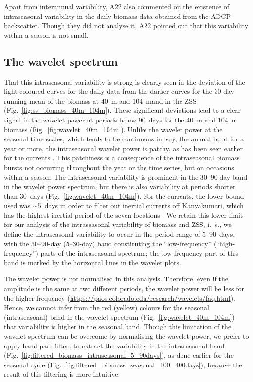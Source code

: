 \documentclass[authoryear,review,11pt]{elsarticle}
\providecommand{\DIFaddtex}[1]{{\protect\color{blue}\uwave{#1}}} %
\providecommand{\DIFaddbegin}{} %
\providecommand{\DIFaddend}{} %
\providecommand{\DIFadd}[1]{\texorpdfstring{\DIFaddtex{#1}}{#1}} %
\begin{document}
Apart from interannual variability, A22 also commented on the existence of intraseasonal variability in the daily biomass data obtained from the ADCP backscatter. Though they did not analyse it, A22 pointed out that this variability within a season is not small.

\subsection{The wavelet spectrum}
\label{sec:intraseasonal.wavelet}

That this intraseasonal variability is strong is clearly seen in the deviation of the light-coloured curves for the daily data from the darker curves for the 30-day running mean of the biomass at 40~m and 104~m\DIFaddbegin \DIFadd{, }\DIFaddend and in the ZSS (Fig.~\ref{fig:ss_biomass_40m_104m}).  These significant deviations lead to a clear signal in the wavelet power at periods below 90~days for the 40~m and 104~m biomass (Fig.~\ref{fig:wavelet_40m_104m}).  Unlike the wavelet power at the seasonal time scales, which tends to be continuous in, say, the annual band for a year or more, the intraseasonal wavelet power is patchy, as has been seen earlier for the currents \citep{amol2014observed, mukherjee2014observed, chaudhuri2020observed, mukhopadhyay2020observed}. This patchiness is a consequence of the intraseasonal biomass bursts not occurring throughout the year or the time series, but on occasions within a season.  The intraseasonal variability is prominent in the 30--90-day band in the wavelet power spectrum, but there is also variability at periods shorter than 30~days (Fig.~\ref{fig:wavelet_40m_104m}). For the currents, the lower bound used was $\sim$5~days in order to filter out inertial currents off Kanyakumari, which has the highest inertial period of the seven locations \citep{amol2014observed, chaudhuri2020observed}.  We retain this lower limit for our analysis of the intraseasonal variability of biomass and ZSS, i.~e., we define the intraseasonal variability to occur in the period range of 5--90~days, with the 30--90-day (5--30-day) band constituting the ``low-frequency'' (``high-frequency'') parts of the intraseasonal spectrum; the low-frequency part of this band is marked by the horizontal lines in the wavelet plots.

The wavelet power is not normalised in this analysis.  Therefore, even if the amplitude is the same at two different periods, the wavelet power will be less for the higher frequency (\url{https://paos.colorado.edu/research/wavelets/faq.html}). Hence, we cannot infer from the red (yellow) colours for the seasonal (intraseasonal) band in the wavelet spectrum (Fig.~\ref{fig:wavelet_40m_104m}) that variability is higher in the seasonal band. Though this limitation of the wavelet spectrum can be overcome by normalising the wavelet power, we prefer to apply band-pass filters to extract the variability in the intraseasonal band (Fig.~\ref{fig:filtered_biomass_intraseasonal_5_90days}), as done earlier for the seasonal cycle (Fig.~\ref{fig:filtered_biomass_seasonal_100_400days}), because the result of this filtering is more intuitive. 
\end{document}
